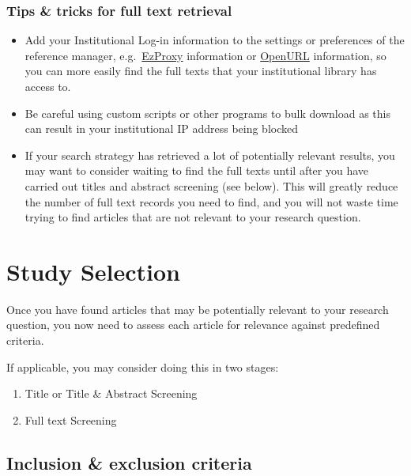 \documentclass[
]{book}
\providecommand{\tightlist}{%
  \setlength{\itemsep}{0pt}\setlength{\parskip}{0pt}}
\begin{document}
\subsection{Tips \& tricks for full text retrieval}\label{tips-tricks-for-full-text-retrieval}

\begin{itemize}
\tightlist
\item
  Add your Institutional Log-in information to the settings or preferences of the reference manager, e.g.~\href{https://ezproxy-db.appspot.com/}{EzProxy} information or \href{https://www.zotero.org/support/locate/openurl_resolvers}{OpenURL} information, so you can more easily find the full texts that your institutional library has access to.
\item
  Be careful using custom scripts or other programs to bulk download as this can result in your institutional IP address being blocked
\item
  If your search strategy has retrieved a lot of potentially relevant results, you may want to consider waiting to find the full texts until after you have carried out titles and abstract screening (see below). This will greatly reduce the number of full text records you need to find, and you will not waste time trying to find articles that are not relevant to your research question.
\end{itemize}

\chapter{Study Selection}\label{study-selection}

Once you have found articles that may be potentially relevant to your research question, you now need to assess each article for relevance against predefined criteria.

If applicable, you may consider doing this in two stages:

\begin{enumerate}
\def\labelenumi{\arabic{enumi}.}
\tightlist
\item
  Title or Title \& Abstract Screening
\item
  Full text Screening
\end{enumerate}

\section{Inclusion \& exclusion criteria}\label{inclusion-exclusion-criteria}
\end{document}
